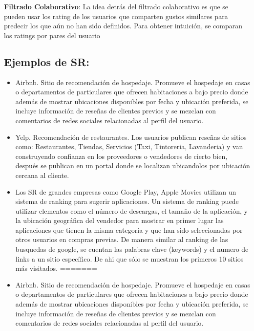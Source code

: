 \textbf{Filtrado Colaborativo}: La idea detrás del filtrado colaborativo
es que se pueden usar los rating de los usuarios que comparten gustos
similares para predecir los que aún no han sido definidos. Para obtener
intuición, se comparan los ratings por pares del usuario

\subsection{ Ejemplos de SR:}

\begin{itemize}

<<<<<<< HEAD
\item Airbnb. Sitio de recomendación de hospedaje. 
Promueve el hospedaje en casas o departamentos de particulares que ofrecen habitaciones a bajo precio donde además de mostrar ubicaciones disponibles por fecha y ubicación preferida, se incluye información de reseñas de clientes previos y se mezclan con comentarios de redes sociales relacionadas al perfil del usuario.

\item Yelp. Recomendación de restaurantes. 
Los usuarios publican reseñas de sitios como: Restaurantes, Tiendas, Servicios (Taxi, Tintoreria, Lavanderia) y van construyendo confianza en los proveedores o vendedores de cierto bien, después se publican en un portal donde se localizan ubicandolos por ubicación cercana al cliente.

\item Los SR de grandes empresas como
Google Play, Apple Movies  utilizan un sistema de ranking para sugerir aplicaciones. Un sistema de ranking puede utilizar elementos como el número de descargas, el tamaño de la aplicación, y la ubicación geográfica del vendedor para mostrar en primer lugar las aplicaciones que tienen la misma categoría y que han sido seleccionadas por otros usuarios en compras previas. De manera similar al ranking de las busquedas de google, se cuentan las palabras clave (keywords) y el numero de links a un sitio específico. De ahi que sólo se muestran los primeros 10 sitios más visitados. 
=======
\item Airbnb. Sitio de recomendación de hospedaje. Promueve el hospedaje en casas o departamentos de particulares que ofrecen habitaciones a bajo precio donde además de mostrar ubicaciones disponibles por fecha y ubicación preferida, se incluye información de reseñas de clientes previos y se mezclan con comentarios de redes sociales relacionadas al perfil del usuario.


\end{itemize}
